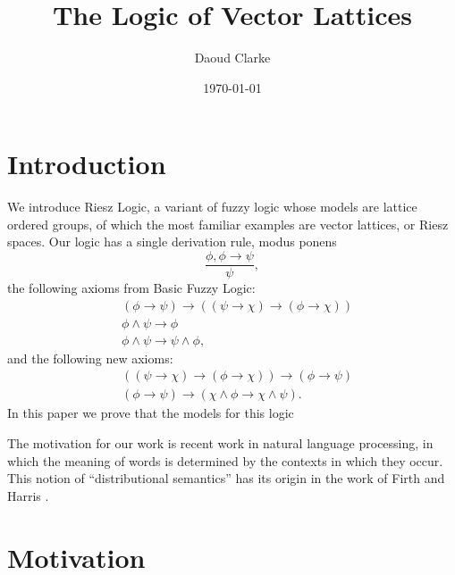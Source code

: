 \documentclass[preprint,leqno]{elsarticle}
\author{Daoud Clarke}
\date{\today}
\title{The Logic of Vector Lattices}
\begin{document}
\maketitle


\section{Introduction}

We introduce Riesz Logic, a variant of fuzzy logic whose models are
lattice ordered groups, of which the most familiar examples are vector
lattices, or Riesz spaces.
%
%
%
%
%
Our logic has a single derivation rule, modus ponens
\begin{equation}\tag{MP}
\frac{\phi, \phi \rightarrow \psi}{\psi},
\end{equation}
the following axioms from Basic Fuzzy Logic:
\begin{align}
  \tag{BL1} &(\phi \rightarrow \psi) \rightarrow ((\psi \rightarrow \chi)
  \rightarrow (\phi \rightarrow \chi))\\
  \tag{BL2} &\phi \land \psi \rightarrow \phi\\
  \tag{BL3} &\phi \land \psi \rightarrow \psi \land \phi,
\end{align}
and the following new axioms:
\begin{align}
  \tag{R1}  &((\psi \rightarrow \chi) \rightarrow (\phi \rightarrow
  \chi)) \rightarrow (\phi \rightarrow \psi)\\
  \tag{R2}  &(\phi \rightarrow \psi) \rightarrow (\chi \land \phi
  \rightarrow \chi \land \psi).
\end{align}
In this paper we prove that the models for this logic


The motivation for our work is recent work in natural language
processing, in which the meaning of words is determined by the
contexts in which they occur. This notion of ``distributional
semantics'' has its origin in the work of Firth \cite{Firth:57} and
Harris \cite{Harris:68}.





\section{Motivation}
\end{document}
